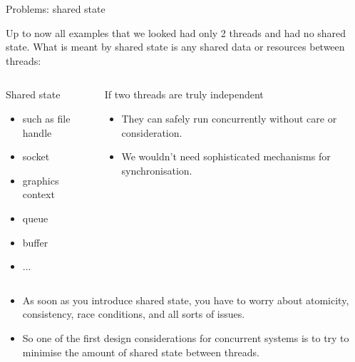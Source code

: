 \documentclass[8pt]{beamer}
\begin{document}
\begin{frame}{Problems: shared state}

Up to now all examples that we looked had only 2 threads and had no shared state. What is meant by shared state is any shared data or resources between threads:

\begin{columns}

\begin{block}{Shared state}
 
\begin{itemize}
  \item such as file handle
  \item socket
  \item graphics context
  \item queue
  \item buffer
  \item ...
\end{itemize}
 
\end{block}

\begin{block}{If two threads are truly independent}

\begin{itemize}
  \item They can safely run concurrently without care or consideration. 
  \item We wouldn’t need sophisticated mechanisms for synchronisation.
\end{itemize}

\end{block}

\end{columns}

\begin{itemize}
  \item As soon as you introduce shared state, you have to worry about atomicity, consistency, race conditions, and all sorts of issues.
  \item So one of the first design considerations for concurrent systems is to try to minimise the amount of shared state between threads.
\end{itemize}

\end{frame}
\end{document}

